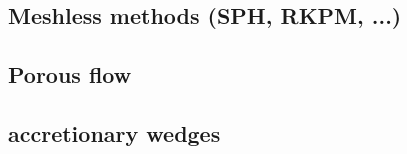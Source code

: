 \subsection*{Meshless methods (SPH, RKPM, ...)}

\cite{febh05}
\cite{nifs15}

\subsection*{Porous flow}

\cite{rabg98}



\subsection*{accretionary wedges}

\cite{mauw16}
\cite{mauw17}



